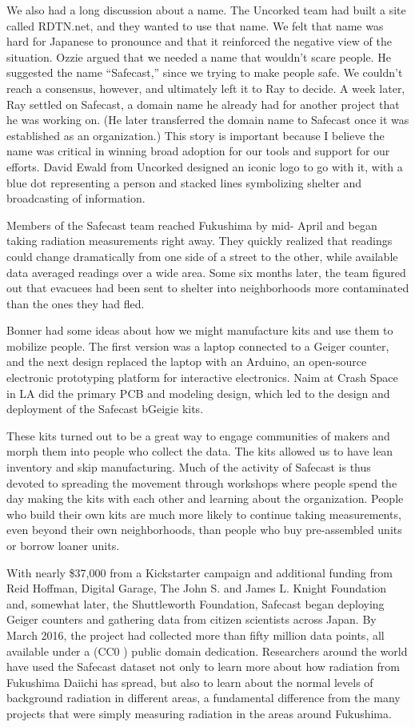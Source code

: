 We also had a long discussion about a name. The Uncorked team had built a site called RDTN.net, and they wanted to use that name. We felt that name was hard for Japanese to pronounce and that it reinforced the negative view of the situation. Ozzie argued that we needed a name that wouldn't scare people. He suggested the name ``Safecast,'' since we trying to make people safe. We couldn't reach a consensus, however, and ultimately left it to Ray to decide. A week later, Ray settled on Safecast, a domain name he already had for another project that he was working on. (He later transferred the domain name to Safecast once it was established as an organization.) This story is important because I believe the name was critical in winning broad adoption for our tools and support for our efforts. David Ewald from Uncorked designed an iconic logo to go with it, with a blue dot representing a person and stacked lines symbolizing shelter and broadcasting of information.

Members of the Safecast team reached Fukushima by mid- April and began taking radiation measurements right away. They quickly realized that readings could change dramatically from one side of a street to the other, while available data averaged readings over a wide area. Some six months later, the team figured out that evacuees had been sent to shelter into neighborhoods more contaminated than the ones they had fled.

Bonner had some ideas about how we might manufacture kits and use them to mobilize people. The first version was a laptop connected to a Geiger counter, and the next design replaced the laptop with an Arduino, an open-source electronic prototyping platform for interactive electronics. Naim at Crash Space in LA did the primary \ac{PCB} and modeling design, which led to the design and deployment of the Safecast bGeigie kits.

These kits turned out to be a great way to engage communities of makers and morph them into people who collect the data. The kits allowed us to have lean inventory and skip manufacturing. Much of the activity of Safecast is thus devoted to spreading the movement through workshops where people spend the day making the kits with each other and learning about the organization. People who build their own kits are much more likely to continue taking measurements, even beyond their own neighborhoods, than people who buy pre-assembled units or borrow loaner units.

With nearly \$37,000 from a Kickstarter campaign and additional funding from Reid Hoffman, Digital Garage, The John S. and James L. Knight Foundation and, somewhat later, the Shuttleworth Foundation, Safecast began deploying Geiger counters and gathering data from citizen scientists across Japan. By March 2016, the project had collected more than fifty million data points, all available under a (CC0 \ccZero) public domain dedication. Researchers around the world have used the Safecast dataset not only to learn more about how radiation from Fukushima Daiichi has spread, but also to learn about the normal levels of background radiation in different areas, a fundamental difference from the many projects that were simply measuring radiation in the areas around Fukushima.

